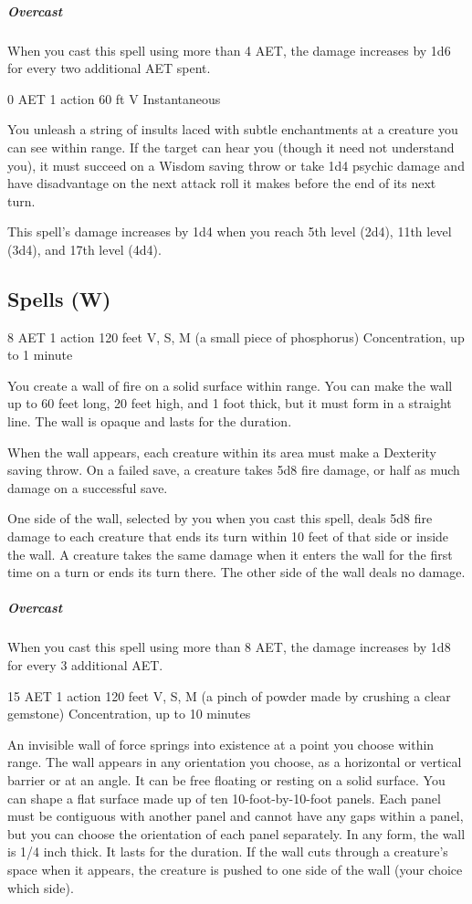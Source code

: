\subparagraph*{Overcast} When you cast this spell using more than 4 AET, the damage increases by 1d6 for every two additional AET spent.

{0 AET}
{1 action}
{60 ft}
{V}
{Instantaneous}

You unleash a string of insults laced with subtle enchantments at a creature you can see within range. If the target can hear you (though it need not understand you), it must succeed on a Wisdom saving throw or take 1d4 psychic damage and have disadvantage on the next attack roll it makes before the end of its next turn.

This spell's damage increases by 1d4 when you reach 5th level (2d4), 11th level (3d4), and 17th level (4d4).

\subsection{Spells (W)}

{8 AET}
{1 action}
{120 feet}
{V, S, M (a small piece of phosphorus)}
{Concentration, up to 1 minute}

You create a wall of fire on a solid surface within range. You can make the wall up to 60 feet long, 20 feet high, and 1 foot thick, but it must form in a straight line. The wall is opaque and lasts for the duration.

When the wall appears, each creature within its area must make a Dexterity saving throw. On a failed save, a creature takes 5d8 fire damage, or half as much damage on a successful save.

One side of the wall, selected by you when you cast this spell, deals 5d8 fire damage to each creature that ends its turn within 10 feet of that side or inside the wall. A creature takes the same damage when it enters the wall for the first time on a turn or ends its turn there. The other side of the wall deals no damage.

\subparagraph*{Overcast} When you cast this spell using more than 8 AET, the damage increases by 1d8 for every 3 additional AET.


{15 AET}
{1 action}
{120 feet}
{V, S, M (a pinch of powder made by crushing a clear gemstone)}
{Concentration, up to 10 minutes}

An invisible wall of force springs into existence at a point you choose within range. The wall appears in any orientation you choose, as a horizontal or vertical barrier or at an angle. It can be free floating or resting on a solid surface. You can shape a flat surface made up of ten 10-foot-by-10-foot panels. Each panel must be contiguous with another panel and cannot have any gaps within a panel, but you can choose the orientation of each panel separately. In any form, the wall is 1/4 inch thick. It lasts for the duration. If the wall cuts through a creature's space when it appears, the creature is pushed to one side of the wall (your choice which side).

